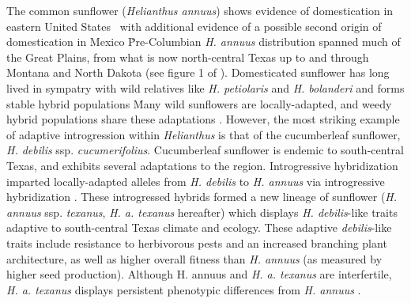 \documentclass[11pt]{article}
\begin{document}
\begin{enumerate}
\begin{enumerate}
The common sunflower (\emph{Helianthus annuus}) shows evidence of domestication in eastern United States \cite{harter2004origin, wills2006chloroplast}\, with additional evidence of a possible second origin of domestication in Mexico \cite{lentz2008sunflower}\.
Pre-Columbian \emph{H. annuus} distribution spanned much of the Great Plains, from what is now north-central Texas up to and through Montana and North Dakota (see figure 1 of \cite{whitney2010adaptive}).
Domesticated sunflower has long lived in sympatry with wild relatives like \emph{H. petiolaris} and \emph{H. bolanderi} and forms stable hybrid populations \cite{schwarzbach2002likely, rieseberg1988molecular, welch2002patterns}\.
Many wild sunflowers are locally-adapted, and weedy hybrid populations share these adaptations \cite{kane2008genetics}.
However, the most striking example of adaptive introgression within \emph{Helianthus} is that of the cucumberleaf sunflower, \emph{H. debilis} ssp. \emph{cucumerifolius}.
Cucumberleaf sunflower is endemic to south-central Texas, and exhibits several adaptations to the region.
Introgressive hybridization imparted locally-adapted alleles from \emph{H. debilis} to \emph{H. annuus} via introgressive hybridization \cite{heiser1951hybridization}. 
These introgressed hybrids formed a new lineage of sunflower (\emph{H. annuus} ssp. \emph{texanus}, \emph{H. a. texanus} hereafter) which displays \emph{H. debilis}-like traits adaptive to south-central Texas climate and ecology.
These adaptive \emph{debilis}-like traits include resistance to herbivorous pests and an increased branching plant architecture, as well as higher overall fitness than \emph{H. annuus} (as measured by higher seed production)\cite{whitney2006adaptive}.
Although H. annuus and \emph{H. a. texanus} are interfertile, \emph{H. a. texanus} displays persistent phenotypic differences from \emph{H. annuus} \cite{rieseberg2007hybridization}.



\end{enumerate}
\end{enumerate}
\end{document}

